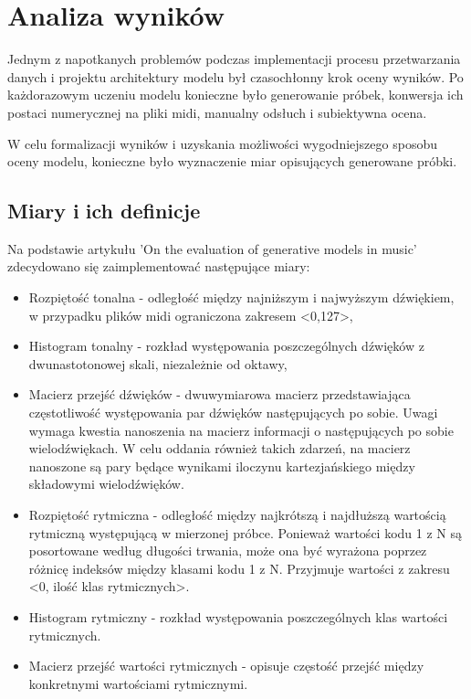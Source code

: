 \chapter{Analiza wyników}
{

    Jednym z\,\,napotkanych problemów podczas implementacji procesu przetwarzania danych i\,\,projektu architektury modelu
    był czasochłonny krok oceny wyników. Po każdorazowym uczeniu modelu konieczne było generowanie próbek, 
    konwersja ich postaci numerycznej na pliki midi, manualny odsłuch i\,\,subiektywna ocena.

    W\,\,celu formalizacji wyników i\,\,uzyskania możliwości wygodniejszego sposobu oceny modelu, konieczne było wyznaczenie
    miar opisujących generowane próbki. 

    \section{Miary i\,\,ich definicje}
    {
        Na podstawie artykułu 'On the evaluation of generative models in music'\cite{Yang2018OnTE} zdecydowano się zaimplementować następujące miary:
        \begin{itemize}
            \setlength\itemsep{-0.5em}
            \item Rozpiętość tonalna - odległość między najniższym i\,\,najwyższym dźwiękiem, w\,\,przypadku plików midi ograniczona
            zakresem <0,127>,
            \item Histogram tonalny - rozkład występowania poszczególnych dźwięków z\,\,dwunastotonowej skali, niezależnie od oktawy, 
            \item Macierz przejść dźwięków - dwuwymiarowa macierz przedstawiająca częstotliwość występowania par dźwięków następujących
            po sobie. Uwagi wymaga kwestia nanoszenia na macierz informacji o\,\,następujących po sobie wielodźwiękach. W\,\,celu oddania
            również takich zdarzeń, na macierz nanoszone są pary będące wynikami iloczynu kartezjańskiego między składowymi wielodźwięków.
            \item Rozpiętość rytmiczna - odległość między najkrótszą i\,\,najdłuższą wartością rytmiczną występującą w\,\,mierzonej próbce. 
            Ponieważ wartości kodu 1 z\,\,N są posortowane według długości trwania, może ona być wyrażona poprzez różnicę indeksów 
            między klasami kodu 1 z\,\,N. Przyjmuje wartości z\,\,zakresu <0, ilość klas rytmicznych>.
            \item Histogram rytmiczny - rozkład występowania poszczególnych klas wartości rytmicznych.
            \item Macierz przejść wartości rytmicznych - opisuje częstość przejść między konkretnymi wartościami rytmicznymi.
        \end{itemize}

}}
